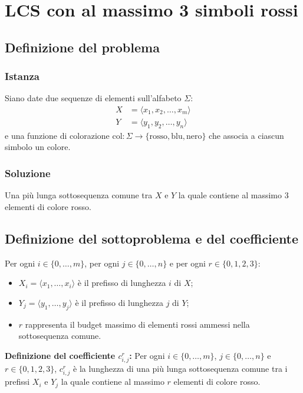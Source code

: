 \chapter{LCS con al massimo 3 simboli rossi}

\section{Definizione del problema}

\subsection{Istanza}
Siano date due sequenze di elementi sull'alfabeto $\Sigma$:
\begin{align*}
    X &= \langle x_1, x_2, \dots, x_m \rangle \\
    Y &= \langle y_1, y_2, \dots, y_n \rangle
\end{align*}
e una funzione di colorazione $\text{col} : \Sigma \to \{\text{rosso}, \text{blu}, \text{nero}\}$ che associa a ciascun simbolo un colore.

\subsection{Soluzione}
Una più lunga sottosequenza comune tra $X$ e $Y$ la quale contiene al massimo $3$ elementi di colore rosso.

\section{Definizione del sottoproblema e del coefficiente}
Per ogni $i \in \{0, \dots, m\}$, per ogni $j \in \{0, \dots, n\}$ e per ogni $r \in \{0, 1, 2, 3\}$:
\begin{itemize}
    \item $X_i = \langle x_1, \dots, x_i \rangle$ è il prefisso di lunghezza $i$ di $X$;
    \item $Y_j = \langle y_1, \dots, y_j \rangle$ è il prefisso di lunghezza $j$ di $Y$;
    \item $r$ rappresenta il budget massimo di elementi rossi ammessi nella sottosequenza comune.
\end{itemize}

\medskip
\noindent
\textbf{Definizione del coefficiente $c_{i,j}^r$:} Per ogni $i \in \{0, \dots, m\}$, $j \in \{0, \dots, n\}$ e $r \in \{0, 1, 2, 3\}$, $c_{i,j}^r$ è la lunghezza di una più lunga sottosequenza comune tra i prefissi $X_i$ e $Y_j$ la quale contiene al massimo $r$ elementi di colore rosso.

